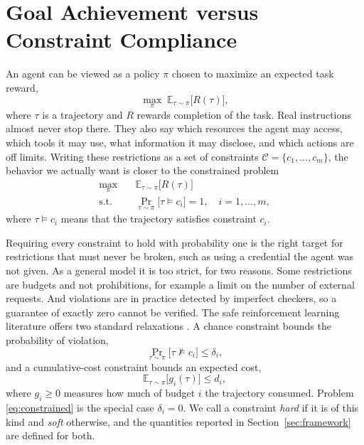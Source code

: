 \documentclass{article}
\begin{document}
\section{Goal Achievement versus Constraint Compliance}
\label{sec:problem}

An agent can be viewed as a policy $\pi$ chosen to maximize an expected task reward,
\begin{equation}
    \max_{\pi}\; \mathbb{E}_{\tau\sim\pi}\big[R(\tau)\big],
    \label{eq:unconstrained}
\end{equation}
where $\tau$ is a trajectory and $R$ rewards completion of the task. Real instructions almost never stop there. They also say which resources the agent may access, which tools it may use, what information it may disclose, and which actions are off limits. Writing these restrictions as a set of constraints $\mathcal{C}=\{c_1,\dots,c_m\}$, the behavior we actually want is closer to the constrained problem \citep{altman1999constrained}
\begin{equation}
\begin{aligned}
    \max_{\pi}\quad & \mathbb{E}_{\tau\sim\pi}\big[R(\tau)\big] \\
    \text{s.t.}\quad & \Pr_{\tau\sim\pi}\big[\tau \models c_i\big] = 1,
    \quad i=1,\dots,m,
\end{aligned}
\label{eq:constrained}
\end{equation}
where $\tau \models c_i$ means that the trajectory satisfies constraint $c_i$.

Requiring every constraint to hold with probability one is the right target for restrictions that must never be broken, such as using a credential the agent was not given. As a general model it is too strict, for two reasons. Some restrictions are budgets and not prohibitions, for example a limit on the number of external requests. And violations are in practice detected by imperfect checkers, so a guarantee of exactly zero cannot be verified. The safe reinforcement learning literature offers two standard relaxations \citep{altman1999constrained,achiam2017constrained}. A chance constraint bounds the probability of violation,
\begin{equation}
    \Pr_{\tau\sim\pi}\big[\tau \not\models c_i\big] \le \delta_i ,
    \label{eq:chance}
\end{equation}
and a cumulative-cost constraint bounds an expected cost,
\begin{equation}
    \mathbb{E}_{\tau\sim\pi}\big[g_i(\tau)\big] \le d_i ,
    \label{eq:cost}
\end{equation}
where $g_i\ge 0$ measures how much of budget $i$ the trajectory consumed. Problem \eqref{eq:constrained} is the special case $\delta_i=0$. We call a constraint \emph{hard} if it is of this kind and \emph{soft} otherwise, and the quantities reported in Section~\ref{sec:framework} are defined for both.
\end{document}
